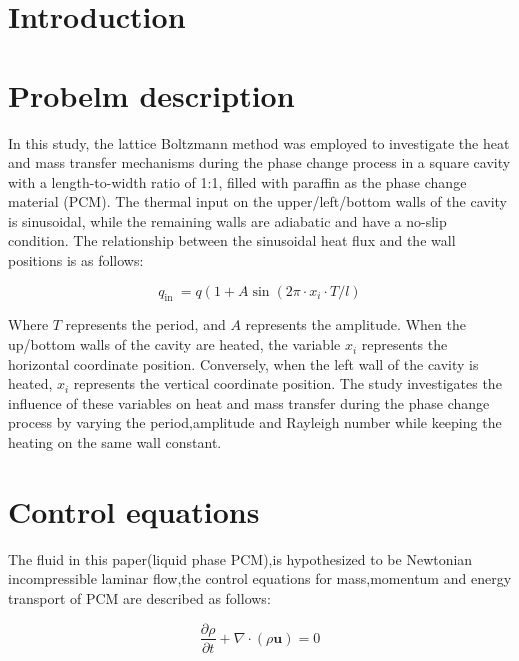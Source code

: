 
\section{Introduction}



\section{Probelm description}
In this study, the lattice Boltzmann method was employed to investigate the heat and mass transfer mechanisms during the phase change process in a square cavity with a length-to-width ratio of 1:1, filled with paraffin as the phase change material (PCM). The thermal input on the upper/left/bottom walls of the cavity is sinusoidal, while the remaining walls are adiabatic and have a no-slip condition. The relationship between the sinusoidal heat flux and the wall positions is as follows: 

\begin{equation}\label{PD.q-up}
q_{\text {in }}=q\left(1+A \sin \left(2 \pi \cdot x_{i} \cdot T / l\right)\right.
\end{equation}

Where $T$ represents the period, and $A$ represents the amplitude. When the up/bottom walls of the cavity are heated, the variable $x_{i}$ represents the horizontal coordinate position. Conversely, when the left wall of the cavity is heated, $x_{i}$ represents the vertical coordinate position. The study investigates the influence of these variables on heat and mass transfer during the phase change process by varying the period,amplitude and Rayleigh number while keeping the heating on the same wall constant.

\section{Control equations}


The fluid in this paper(liquid phase PCM),is hypothesized to be Newtonian incompressible laminar flow,the control equations for mass,momentum and energy transport of PCM are described as follows:

\begin{equation}\label{CE.rho}
	\frac{\partial \rho}{\partial t}+\nabla \cdot(\rho \boldsymbol{u})=0 
\end{equation}

